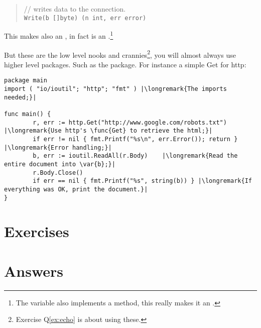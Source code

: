 \begin{quote}
//  writes data to the connection.\\
\lstinline{Write(b []byte) (n int, err error)}
\end{quote}
This makes  also an , in fact  is an
.\footnote{The variable  also implements a  method, this really makes
it an .}

But these are the low level nooks and crannies\footnote{Exercise Q\ref{ex:echo} is about using
these.}, you will almost always use higher level packages.
Such as the  package. For instance a simple Get for http:
\begin{lstlisting}
package main
import ( "io/ioutil"; "http"; "fmt" ) |\longremark{The imports needed;}|

func main() {
        r, err := http.Get("http://www.google.com/robots.txt") |\longremark{Use http's \func{Get} to retrieve the html;}|
        if err != nil { fmt.Printf("%s\n", err.Error()); return } |\longremark{Error handling;}|
        b, err := ioutil.ReadAll(r.Body)    |\longremark{Read the entire document into \var{b};}|
        r.Body.Close()  
        if err == nil { fmt.Printf("%s", string(b)) } |\longremark{If everything was OK, print the document.}|
}
\end{lstlisting}
\showremarks

\section{Exercises}














\cleardoublepage
\section{Answers}
\shipoutAnswer
